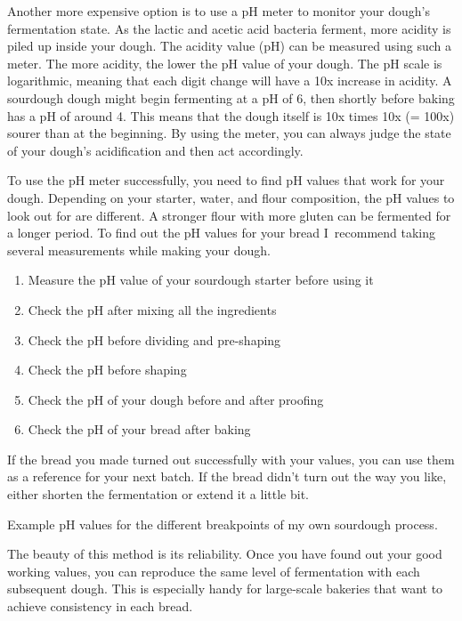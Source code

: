 Another more expensive option is to use a pH meter
to monitor your dough's fermentation state. As the lactic
and acetic acid bacteria ferment, more acidity is piled
up inside your dough. The acidity value (pH) can be
measured using such a meter. The more acidity, the lower the pH
value of your dough. The pH scale is logarithmic, meaning
that each digit change will have a 10x increase in acidity.
A sourdough dough might begin fermenting at a pH of 6,
then shortly before baking has a pH of around 4. This means
that the dough itself is 10x times 10x (= 100x) sourer
than at the beginning. By using the meter, you can always
judge the state of your dough's acidification and then act
accordingly.

To use the pH meter successfully, you need to find pH values
that work for your dough. Depending on your starter,
water, and flour composition, the pH values to look out
for are different. A stronger flour with more gluten
can be fermented for a longer period. To find out
the pH values for your bread I~recommend taking
several measurements while making your dough.

\begin{enumerate}
  \item Measure the pH value of your sourdough starter before using it
  \item Check the pH after mixing all the ingredients
  \item Check the pH before dividing and pre-shaping
  \item Check the pH before shaping
  \item Check the pH of your dough before and after proofing
  \item Check the pH of your bread after baking
\end{enumerate}

If the bread you made turned out successfully with your values,
you can use them as a reference for your next batch. If the
bread didn't turn out the way you like, either shorten
the fermentation or extend it a little bit.

\begin{table}[!htb]
    \begin{center}
        \caption{Example pH values for the different breakpoints of my own
        sourdough process.}%
        \label{table:sample-ph-values}
    \end{center}
\end{table}

The beauty of this method is its reliability. Once you have found
out your good working values, you can reproduce
the same level of fermentation with each subsequent dough.
This is especially handy for large-scale bakeries that want
to achieve consistency in each bread.

